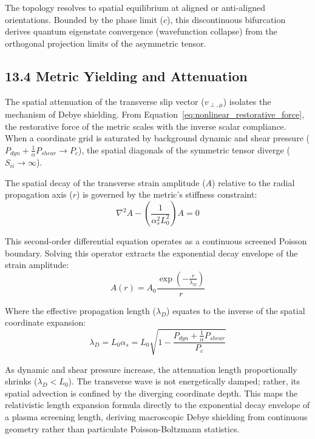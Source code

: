 The topology resolves to spatial equilibrium at aligned or anti-aligned orientations. Bounded by the phase limit ($c$), this discontinuous bifurcation derives quantum eigenstate convergence (wavefunction collapse) from the orthogonal projection limits of the asymmetric tensor.


\subsection*{13.4 Metric Yielding and Attenuation} 
The spatial attenuation of the transverse slip vector ($v_{\perp, \mu}$) isolates the mechanism of Debye shielding. From Equation~\ref{eq:nonlinear_restorative_force}, the restorative force of the metric scales with the inverse scalar compliance. When a coordinate grid is saturated by background dynamic and shear pressure ($P_{dyn} + \frac{1}{\alpha}P_{shear} \to P_c$), the spatial diagonals of the symmetric tensor diverge ($S_{ii} \to \infty$). %

The spatial decay of the transverse strain amplitude ($A$) relative to the radial propagation axis ($r$) is governed by the metric's stiffness constraint: 
\begin{equation}
    \nabla^2 A - \left( \frac{1}{\alpha_s^2 L_0^2} \right) A = 0
\end{equation}

This second-order differential equation operates as a continuous screened Poisson boundary. Solving this operator extracts the exponential decay envelope of the strain amplitude: 
\begin{equation}
    A(r) = A_0 \frac{\exp\left(-\frac{r}{\lambda_D}\right)}{r} 
\end{equation}

Where the effective propagation length ($\lambda_D$) equates to the inverse of the spatial coordinate expansion: 
\begin{equation}
    \lambda_D = L_0 \alpha_s = L_0 \sqrt{1 - \frac{P_{dyn} + \frac{1}{\alpha}P_{shear}}{P_c}} %
\end{equation}

As dynamic and shear pressure increase, the attenuation length proportionally shrinks ($\lambda_D < L_0$). The transverse wave is not energetically damped; rather, its spatial advection is confined by the diverging coordinate depth. This maps the relativistic length expansion formula directly to the exponential decay envelope of a plasma screening length, deriving macroscopic Debye shielding from continuous geometry rather than particulate Poisson-Boltzmann statistics. %

